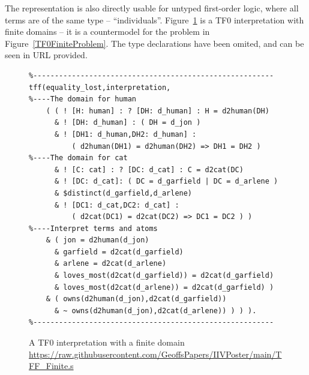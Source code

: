\documentclass[letterpaper]{article}
\begin{document}
The representation is also directly usable for untyped first-order logic, where all terms 
are of the same type – ``individuals''. 
% 
Figure~\ref{TF0FiniteInterpretation} is a TF0 interpretation with finite domains -- it is a 
countermodel for the problem in Figure~\ref{TF0FiniteProblem}.
The type declarations have been omited, and can be seen in URL provided.

\begin{figure}[htbp]
\scriptsize
{}
\begin{verbatim}
%--------------------------------------------------------
tff(equality_lost,interpretation,
%----The domain for human
    ( ( ! [H: human] : ? [DH: d_human] : H = d2human(DH)
      & ! [DH: d_human] : ( DH = d_jon )
      & ! [DH1: d_human,DH2: d_human] :
          ( d2human(DH1) = d2human(DH2) => DH1 = DH2 )
%----The domain for cat
      & ! [C: cat] : ? [DC: d_cat] : C = d2cat(DC)
      & ! [DC: d_cat]: ( DC = d_garfield | DC = d_arlene )
      & $distinct(d_garfield,d_arlene)
      & ! [DC1: d_cat,DC2: d_cat] :
          ( d2cat(DC1) = d2cat(DC2) => DC1 = DC2 ) )
%----Interpret terms and atoms
    & ( jon = d2human(d_jon)
      & garfield = d2cat(d_garfield)
      & arlene = d2cat(d_arlene)
      & loves_most(d2cat(d_garfield)) = d2cat(d_garfield)
      & loves_most(d2cat(d_arlene)) = d2cat(d_garfield) )
    & ( owns(d2human(d_jon),d2cat(d_garfield))
      & ~ owns(d2human(d_jon),d2cat(d_arlene)) ) ) ).
%--------------------------------------------------------
\end{verbatim}
\caption{A TF0 interpretation with a finite domain \\
{\scriptsize \url{https://raw.githubusercontent.com/GeoffsPapers/IIVPoster/main/TFF_Finite.s}}}
\label{TF0FiniteInterpretation}
\end{figure}
\end{document}
